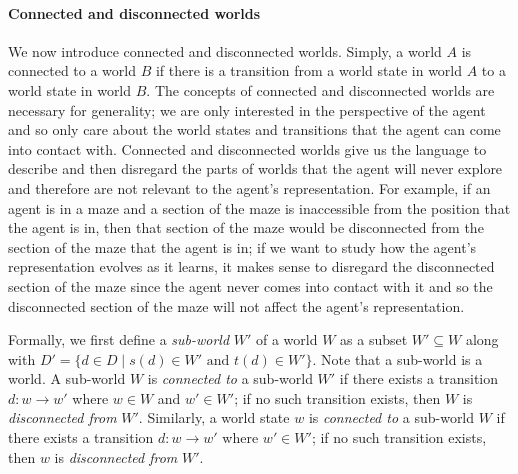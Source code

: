 \paragraph{Connected and disconnected worlds}
We now introduce connected and disconnected worlds.
Simply, a world $A$ is connected to a world $B$ if there is a transition from a world state in world $A$ to a world state in world $B$.
The concepts of connected and disconnected worlds are necessary for generality; we are only interested in the perspective of the agent and so only care about the world states and transitions that the agent can come into contact with.
Connected and disconnected worlds give us the language to describe and then disregard the parts of worlds that the agent will never explore and therefore are not relevant to the agent's representation.
For example, if an agent is in a maze and a section of the maze is inaccessible from the position that the agent is in, then that section of the maze would be disconnected from the section of the maze that the agent is in; if we want to study how the agent's representation evolves as it learns, it makes sense to disregard the disconnected section of the maze since the agent never comes into contact with it and so the disconnected section of the maze will not affect the agent's representation.

Formally, we first define a \textit{sub-world} $W'$ of a world $W$ as a subset $W' \subseteq W$ along with $D' = \{d \in D \mid s(d) \in W'\text{ and }t(d) \in W'\}$.
Note that a sub-world is a world.
A sub-world $W$ is \textit{connected to} a sub-world $W'$ if there exists a transition $d: w \to w'$ where $w \in W$ and $w' \in W'$; if no such transition exists, then $W$ is \textit{disconnected from} $W'$.
Similarly, a world state $w$ is \textit{connected to} a sub-world $W$ if there exists a transition $d: w \to w'$ where $w' \in W'$; if no such transition exists, then $w$ is \textit{disconnected from} $W'$.



